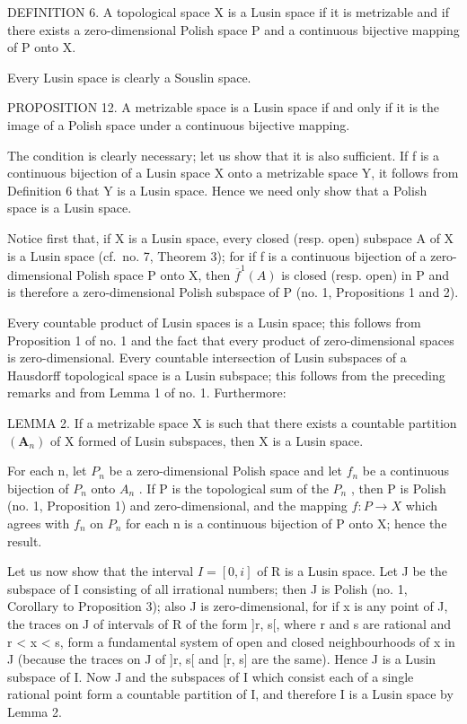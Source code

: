 DEFINITION 6. A topological space X is a Lusin space if it is metrizable and if there exists a zero-dimensional Polish space P and a continuous bijective mapping of P onto X.

Every Lusin space is clearly a Souslin space.

PROPOSITION 12. A metrizable space is a Lusin space if and only if it is the image of a Polish space under a continuous bijective mapping.

The condition is clearly necessary; let us show that it is also sufficient. If f is a continuous bijection of a Lusin space X onto a metrizable space Y, it follows from Definition 6 that Y is a Lusin space. Hence we need only show that a Polish space is a Lusin space.

Notice first that, if X is a Lusin space, every closed (resp. open) subspace A of X is a Lusin space (cf.~no. 7, Theorem 3); for if f is a continuous bijection of a zero-dimensional Polish space P onto X, then \(\overline{f}^{1}(A)\) is closed (resp. open) in P and is therefore a zero-dimensional Polish subspace of P (no. 1, Propositions 1 and 2).

Every countable product of Lusin spaces is a Lusin space; this follows from Proposition 1 of no. 1 and the fact that every product of zero-dimensional spaces is zero-dimensional. Every countable intersection of Lusin subspaces of a Hausdorff topological space is a Lusin subspace; this follows from the preceding remarks and from Lemma 1 of no. 1. Furthermore:

LEMMA 2. If a metrizable space X is such that there exists a countable partition \((\mathbf{A}_{n})\) of X formed of Lusin subspaces, then X is a Lusin space.

For each n, let \(P_{n}\) be a zero-dimensional Polish space and let \(f_{n}\) be a continuous bijection of \(P_{n}\) onto \(A_{n}\) . If P is the topological sum of the \(P_{n}\) , then P is Polish (no. 1, Proposition 1) and zero-dimensional, and the mapping \(f: P \to X\) which agrees with \(f_{n}\) on \(P_{n}\) for each n is a continuous bijection of P onto X; hence the result.

Let us now show that the interval \(I = [0, i]\) of R is a Lusin space. Let J be the subspace of I consisting of all irrational numbers; then J is Polish (no. 1, Corollary to Proposition 3); also J is zero-dimensional, for if x is any point of J, the traces on J of intervals of R of the form {]}r, s{[}, where r and s are rational and r \textless{} x \textless{} s, form a fundamental system of open and closed neighbourhoods of x in J (because the traces on J of {]}r, s{[} and {[}r, s{]} are the same). Hence J is a Lusin subspace of I. Now J and the subspaces of I which consist each of a single rational point form a countable partition of I, and therefore I is a Lusin space by Lemma 2.

